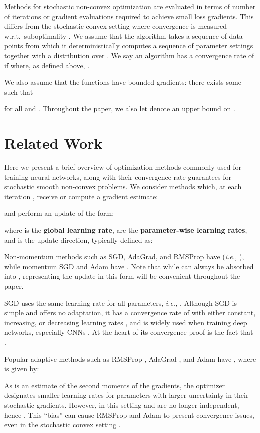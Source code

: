 \documentclass{article}
\newcommand{\ie}{\textit{i.e.,} }
\begin{document}
Methods for stochastic non-convex optimization are evaluated in terms of number
of iterations or gradient evaluations required to achieve small loss gradients.
This differs from the stochastic convex setting where convergence is measured
w.r.t.~suboptimality .  We assume that the
algorithm takes a sequence of data points  from which
it deterministically computes a sequence of parameter settings
 together with a distribution  over
.  We say an algorithm has a convergence rate of  if
 where, as defined above, .

We also assume that the functions  have bounded gradients: there exists
some  such that
   
for all  and .  Throughout the paper, we also let
 denote an upper bound on .
 \section{Related Work}
\label{sec:related}

Here we present a brief overview of optimization methods commonly used for
training neural networks, along with their convergence rate guarantees for
stochastic smooth non-convex problems.  We consider methods which, at each
iteration , receive or compute a gradient estimate:

and perform an update of the form:

where  is the \textbf{global learning rate},
 are the \textbf{parameter-wise learning rates}, and
 is the update direction, typically defined as:

Non-momentum methods such as SGD, AdaGrad, and RMSProp \citep{rmsprop, adagrad}
have  (\ie ), while momentum SGD and Adam
\citep{adam} have .  Note that while  can always be
absorbed into , representing the update in this form will be convenient
throughout the paper.

SGD uses the same learning rate for all parameters, \ie .
Although SGD is simple and offers no adaptation, it has a convergence rate of
 with either constant, increasing, or decreasing learning rates
\citep{nonconvex}, and is widely used when training deep networks, especially
CNNs \citep{resnet1, densenet}.  At the heart of its convergence proof is the
fact that
   .

Popular adaptive methods such as RMSProp \citep{rmsprop}, AdaGrad
\citep{adagrad}, and Adam \citep{adam} have
   ,
where  is given by:

As  is an estimate of the second moments of the gradients, the
optimizer designates smaller learning rates for parameters with larger
uncertainty in their stochastic gradients.  However, in this setting 
and  are no longer independent, hence
   .
This ``bias'' can cause RMSProp and Adam to present convergence issues, even in
the stochastic convex setting \citep{amsgrad}.
\end{document}
